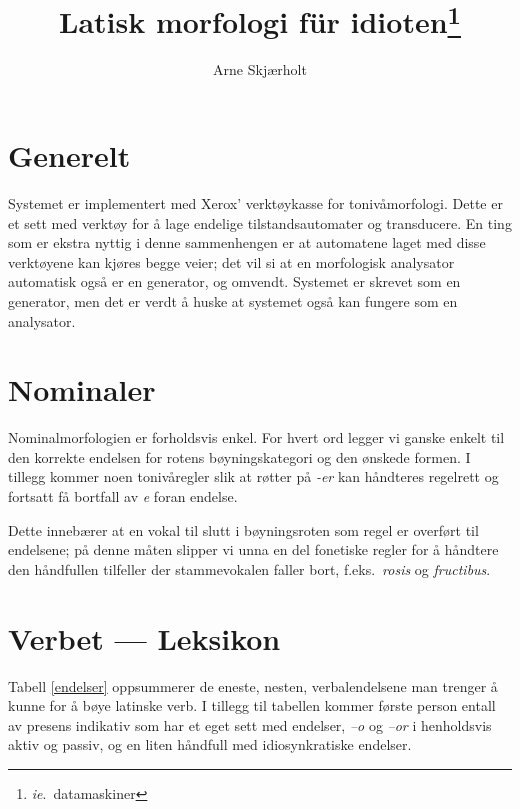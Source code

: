 \documentclass[a4paper]{article}
\title{Latisk morfologi f\"ur idioten\footnote{\emph{ie}.~datamaskiner}}
\author{Arne Skj\ae{}rholt}
\begin{document}
\maketitle

\section{Generelt}
Systemet er implementert med Xerox' verkt\o{}ykasse for toniv\aa{}morfologi.
Dette er et sett med verkt\o{}y for \aa{} lage endelige tilstandsautomater og
transducere. En ting som er ekstra nyttig i denne sammenhengen er at
automatene laget med disse verkt\o{}yene kan kj\o{}res begge veier; det vil si
at en morfologisk analysator automatisk ogs\aa{} er en generator, og omvendt.
Systemet er skrevet som en generator, men det er verdt \aa{} huske at systemet
ogs\aa{} kan fungere som en analysator.

\section{Nominaler}
Nominalmorfologien er forholdsvis enkel. For hvert ord legger vi ganske enkelt
til den korrekte endelsen for rotens b\o{}yningskategori og den \o{}nskede
formen. I tillegg kommer noen toniv\aa{}regler slik at r\o{}tter p\aa{}
\emph{-er} kan h\aa{}ndteres regelrett og fortsatt f\aa{} bortfall av \emph{e}
foran endelse.

Dette inneb\ae{}rer at en vokal til slutt i b\o{}yningsroten som regel er
overf\o{}rt til endelsene; p\aa{} denne m\aa{}ten slipper vi unna en del
fonetiske regler for \aa{} h\aa{}ndtere den h\aa{}ndfullen tilfeller der
stammevokalen faller bort, f.eks.~\emph{rosis} og \emph{fructibus}.

\section{Verbet --- Leksikon}
Tabell \ref{endelser} oppsummerer de eneste, nesten, verbalendelsene man
trenger \aa{} kunne for \aa{} b\o{}ye latinske verb. I tillegg til tabellen
kommer f\o{}rste person entall av presens indikativ som har et eget sett med
endelser, \emph{--o} og \emph{--or} i henholdsvis aktiv og passiv, og en liten
h\aa{}ndfull med idiosynkratiske endelser.
\end{document}
